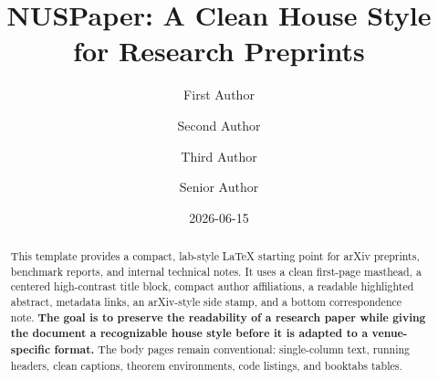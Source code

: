 \documentclass{nuspaper}
\title{NUSPaper: A Clean House Style for Research Preprints}
\date{2026-06-15}
\author[1,*]{First Author}
\author[1,*]{Second Author}
\author[2]{Third Author}
\author[1,\dag]{Senior Author}
\affil[1]{National University of Singapore}
\affil[2]{Partner Institution}
\begin{document}
\maketitle

\begin{abstract}
This template provides a compact, lab-style LaTeX starting point for arXiv preprints, benchmark reports, and internal technical notes. It uses a clean first-page masthead, a centered high-contrast title block, compact author affiliations, a readable highlighted abstract, metadata links, an arXiv-style side stamp, and a bottom correspondence note. \textbf{The goal is to preserve the readability of a research paper while giving the document a recognizable house style before it is adapted to a venue-specific format.} The body pages remain conventional: single-column text, running headers, clean captions, theorem environments, code listings, and booktabs tables.
\end{abstract}








\nocite{knuth1984texbook,example2026template}


\appendix

\end{document}
